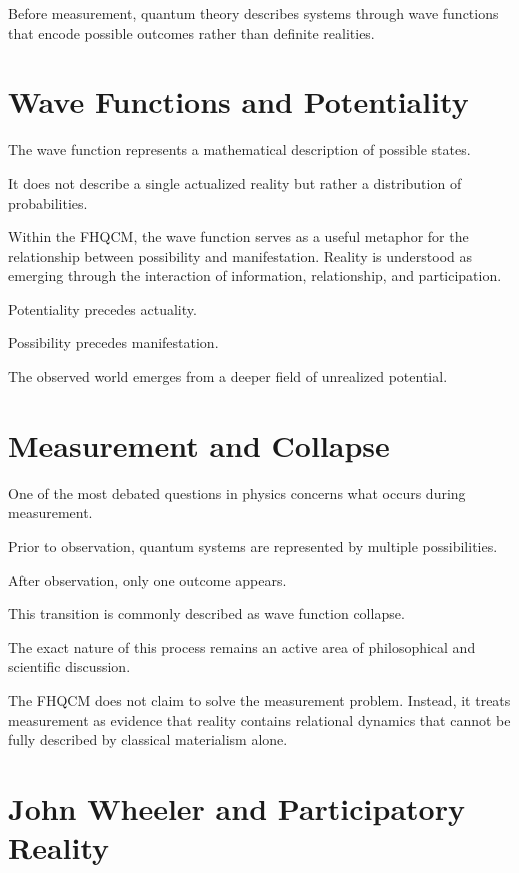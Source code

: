 Before measurement, quantum theory describes systems through wave functions that encode possible outcomes rather than definite realities.

\section{Wave Functions and Potentiality}

The wave function represents a mathematical description of possible states.

It does not describe a single actualized reality but rather a distribution of probabilities.

Within the FHQCM, the wave function serves as a useful metaphor for the relationship between possibility and manifestation. Reality is understood as emerging through the interaction of information, relationship, and participation.

Potentiality precedes actuality.

Possibility precedes manifestation.

The observed world emerges from a deeper field of unrealized potential.

\section{Measurement and Collapse}

One of the most debated questions in physics concerns what occurs during measurement.

Prior to observation, quantum systems are represented by multiple possibilities.

After observation, only one outcome appears.

This transition is commonly described as wave function collapse.

The exact nature of this process remains an active area of philosophical and scientific discussion.

The FHQCM does not claim to solve the measurement problem. Instead, it treats measurement as evidence that reality contains relational dynamics that cannot be fully described by classical materialism alone.


\section{John Wheeler and Participatory Reality}

